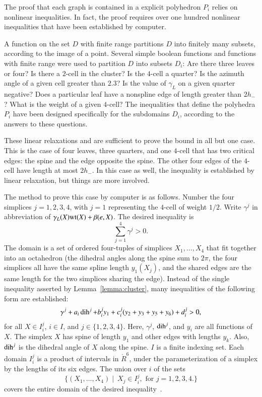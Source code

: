 The proof that each graph is contained in a explicit polyhedron $P_i$
relies on nonlinear inequalities.  In fact, the proof requires over
one hundred nonlinear inequalities that have been established by
computer.

A function on the set $D$ with finite range partitions $D$ into
finitely many subsets, according to the image of a point.  Several
simple boolean functions and functions with finite range were used to
partition $D$ into subsets $D_i$: Are there three leaves or four?  Is
there a $2$-cell in the cluster?  Is the $4$-cell a quarter?  Is the
azimuth angle of a given cell greater than $2.3$?  Is the value of
$\gamma_L$ on a given quarter negative? Does a particular leaf have a
nonspline edge of length greater than $2h_-$?  What is the weight of a
given $4$-cell?  The inequalities that define the polyhedra $P_i$ have
been designed specifically for the subdomains $D_i$, according to the
answers to these questions.

These linear relaxations and are sufficient to prove the bound in all
but one case.  This is the case of four leaves, three quarters, and
one $4$-cell that has two critical edges: the spine and the edge
opposite the spine.  The other four edges of the $4$-cell have length
at most $2h_-$.  In this case as well, the inequality is established
by linear relaxation, but things are more involved.

The method to prove this case by computer is as follows.  Number the
four simplices $j=1,2,3,4$, with $j=1$ representing the $4$-cell of
weight $1/2$.  Write $\gamma^j$ in abbreviation of
$\gamma_L(X){\operatorname{wt}}(X) + \beta(e,X)$.  The desired inequality is
\begin{equation}\label{eqn:gpos}
\sum_{j=1}^4 \gamma^j > 0.
\end{equation}
The domain is a set of ordered four-tuples of simplices
$X_1,\ldots,X_4$ that fit together into an octahedron (the dihedral
angles along the spine sum to $2\pi$, the four simplices all have the
same spline length $y_1(X_j)$, and the shared edges are the same
length for the two simplices sharing the edge).  Instead of the single
inequality asserted by Lemma~\ref{lemma:cluster}, many inequalities of
the following form are established:
\begin{equation}\label{eqn:gpart}
\gamma^j + a_i \operatorname{dih}^j + b_i^j y_1 + c_i^j (y_2+y_3+y_5+y_6) + d_i^j > 0, 
\end{equation}
for all $X \in I_i^j$, \quad $i \in I$, and $j\in \{1,2,3,4\}$.  Here,
$\gamma^j$, $\operatorname{dih}^j$, and $y_i$ are all functions of $X$.  The simplex
$X$ has spine of length $y_1$ and other edges with lengths $y_k$.
Also, $\operatorname{dih}^j$ is the dihedral angle of $X$ along the spine.  $I$ is a
finite indexing set.  Each domain $I_i^j$ is a product of intervals in
$\ring{R}^6$, under the parameterization of a simplex by the lengths
of its six edges.  The union over $i$ of the sets
\begin{displaymath}
\{(X_1,\ldots,X_4)\mid~ X_j \in I_i^j,\text{ for } j=1,2,3,4.\}
\end{displaymath}
covers the entire domain of the desired inequality~.   

